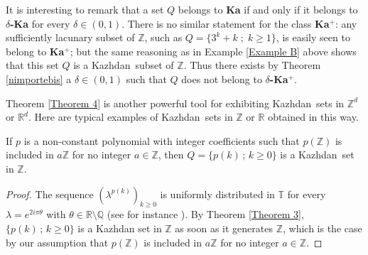 \documentclass[11pt,english,a4paper]{smfart}
\numberwithin{equation}{section}
\theoremstyle{definition}
\begin{document}
It is interesting to remark \cite{Ha2} that a set ${Q}$ belongs to \textbf{Ka} if and only if it belongs to \textbf{$\delta$-Ka} for every $\delta\in (0,1)$. There is no similar statement for the class \textbf{Ka}$^{+}$: any sufficiently lacunary subset of ${\ensuremath{\mathbb Z}}$, such as ${Q}=\{3^k+k \; ;\; k\ge 1\}$, is easily seen to belong to \textbf{Ka}$^{+}$;
but the same reasoning as in Example \ref{Example B} above shows that this set ${Q}$ is a {Kazhdan}\ subset of ${\ensuremath{\mathbb Z}}$. Thus there exists by Theorem \ref{nimportebis} a $\delta\in (0,1)$ such that ${Q}$
does not belong to \textbf{$\delta$-Ka$^{+}$}.
\par\smallskip
Theorem \ref{Theorem 4} is another powerful  tool for exhibiting {Kazhdan}\ sets in ${\ensuremath{\mathbb Z}}^{d}$ or ${\ensuremath{\mathbb R}}^{d}$. Here are typical examples of {Kazhdan}\ sets in ${\ensuremath{\mathbb Z}}$ or ${\ensuremath{\mathbb R}}$ obtained in this way.
\begin{example}\label{Example C} 
 If $p$ is a non-constant polynomial with integer coefficients such that $p({\ensuremath{\mathbb Z}})$ is included in $a{\ensuremath{\mathbb Z}}$ for no integer $a\in{\ensuremath{\mathbb Z}}$, then ${Q}=\{p(k)\,;\,k\ge 0\}$ is a {Kazhdan}\ set in ${\ensuremath{\mathbb Z}}$.
\end{example}
 \begin{proof}
The sequence $(\lambda ^{p(k)})_{k\ge 0}$ is uniformly distributed in ${\ensuremath{\mathbb T}}$ for every  $\lambda =e^{2i\pi \theta }$ with $\theta \in{\ensuremath{\mathbb R}}\setminus{\ensuremath{\mathbb Q}}$ (see for instance \cite{KuiNied}). By Theorem \ref{Theorem 3}, $\{p(k)\,;\,k\ge 0\}$ is a Kazhdan set in ${\ensuremath{\mathbb Z}}$ as soon as it generates ${\ensuremath{\mathbb Z}}$, which is the case by our assumption that $p({\ensuremath{\mathbb Z}})$ is included in $a{\ensuremath{\mathbb Z}}$ for no integer $a\in{\ensuremath{\mathbb Z}}$.
\end{proof}
\end{document}
